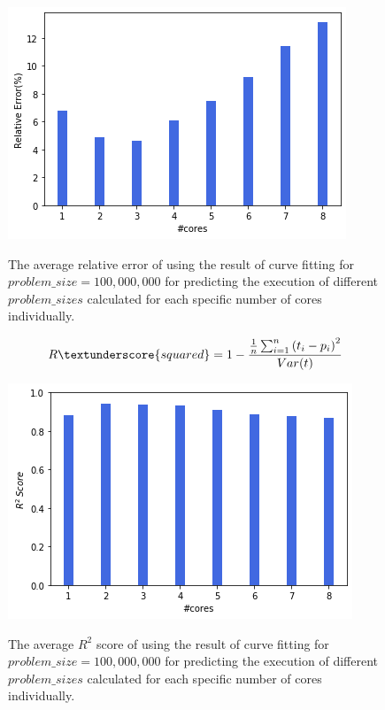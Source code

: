 \begin{figure}[H]
	\centering
	{\includegraphics[scale=.45]{images/hpx_for_loop/fitted/marvin_relative_error_all.png}}
	\caption{The average relative error of using the result of curve fitting for $problem\_size=100,000,000$ for predicting the execution of different $problem\_{sizes}$ calculated for each specific number of cores individually.}\label{fig45}		
\end{figure}

\begin{equation}{\label{eq5}}
R\textunderscore{squared} = 1-\frac{{\frac{1}{n}\sum_{i=1}^{n}{(t_i-p_i)}^2}}{Var(t)}
\end{equation}

\begin{figure}[H]
	\centering
	{\includegraphics[scale=.45]{images/hpx_for_loop/fitted/marvin_r2_error_all.png}}
	\caption{The average $R^2$ score of using the result of curve fitting for $problem\_size=100,000,000$ for predicting the execution of different $problem\_{sizes}$ calculated for each specific number of cores individually.}\label{fig46}		
\end{figure}

